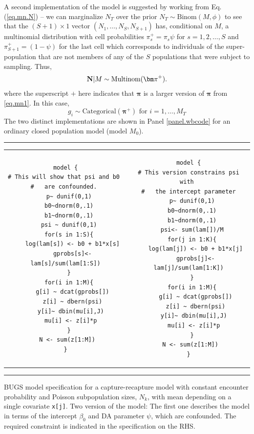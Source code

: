 A second implementation of the model is suggested by working from
Eq. (\ref{eq.mn.N}) -- we can marginalize $N_{T}$
over the prior  $N_{T} \sim \mbox{Binom}(M, \phi)$ to see that 
the  $(S+1) \times 1$ vector 
$(N_{1},\ldots,N_{S},N_{S+1})$ has, conditional on $M$, 
a multinomial distribution 
with cell probabilities
$\pi_{s}^{+} = \pi_{s} \psi$ for $s=1,2,\ldots,S$  and 
 $\pi_{S+1}^{+} = (1-\psi)$ for the last cell which
 corresponds to individuals of the super-population that are not
 members of any of the $S$ populations that were subject to sampling. 
Thus,
\[
{\bf N}|M \sim \mbox{Multinom}({\bm \pi}^{+}).
\]
where the superscript $+$ here indicates that ${\bm \pi}$ is a larger
version of ${\bm \pi}$ from \ref{eq.mn1}.  In this case,
\begin{equation}
g_{i}  \sim \mbox{Categorical}( {\bm \pi}^{+} ) \mbox{ for
  $i=1,\ldots,M_{T}$}  \label{eq.parm1c}
\end{equation}
The two distinct implementations are shown in 
Panel \ref{panel.wbcode} for an ordinary closed population model
(model $M_{0}$).


\begin{panel}[htp]   
\renewcommand{\baselinestretch}{1.0}
\centering
\rule[0.15in]{\textwidth}{.03in}
\begin{tabular}{cc}
\begin{minipage}{2.75in}
{\small
\begin{verbatim}
model {
# This will show that psi and b0 
#   are confounded. 
  p~ dunif(0,1)
  b0~dnorm(0,.1)
  b1~dnorm(0,.1)
  psi ~ dunif(0,1)
  for(s in 1:S){
    log(lam[s]) <- b0 + b1*x[s]
    gprobs[s]<- lam[s]/sum(lam[1:S])
  }
  for(i in 1:M){
    g[i] ~ dcat(gprobs[])
    z[i] ~ dbern(psi)
   y[i]~ dbin(mu[i],J)
   mu[i] <- z[i]*p
  }
  N <- sum(z[1:M]) 
}
\end{verbatim}
}
\end{minipage}
&
\begin{minipage}{2.75in}
{\small
\begin{verbatim}
model {
# This version constrains psi with 
#   the intercept parameter
  p~ dunif(0,1)
  b0~dnorm(0,.1)
  b1~dnorm(0,.1)
  psi<- sum(lam[])/M
  for(j in 1:K){
    log(lam[j]) <- b0 + b1*x[j]
    gprobs[j]<- lam[j]/sum(lam[1:K])
  }
  for(i in 1:M){
    g[i] ~ dcat(gprobs[])
    z[i] ~ dbern(psi)
   y[i]~ dbin(mu[i],J)
   mu[i] <- z[i]*p
  }
  N <- sum(z[1:M]) 
}
\end{verbatim}
}
\end{minipage}
\end{tabular}
\rule[-0.15in]{\textwidth}{.03in}
\caption{BUGS model specification for a capture-recapture model with
  constant encounter probability and Poisson subpopulation sizes,
  $N_{k}$, with mean depending on a single covariate \mbox{\tt x[j]}. 
Two version of the model: The first one describes the model in terms
of the intercept $\beta_0$ and DA parameter $\psi$, which are
confounded. The required constraint is indicated in the specification
on the RHS. 
}
\label{panel.wbcode}
\end{panel}

